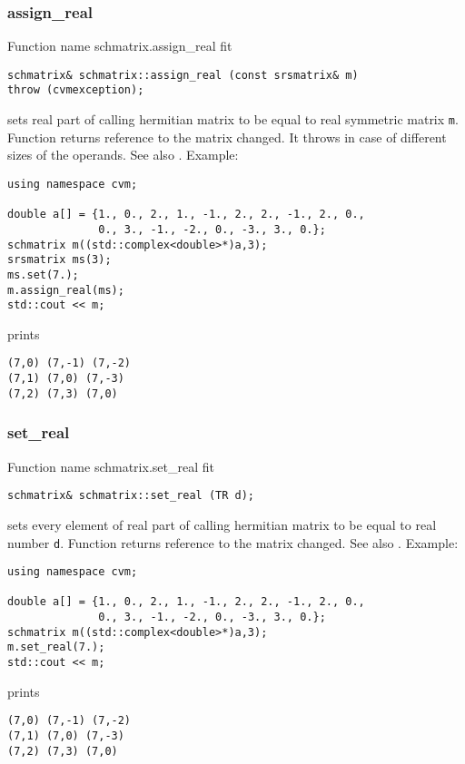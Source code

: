\subsubsection{assign\_real}
Function%
\pdfdest name {schmatrix.assign_real} fit
\begin{verbatim}
schmatrix& schmatrix::assign_real (const srsmatrix& m) 
throw (cvmexception);
\end{verbatim}
sets real part of  calling hermitian matrix to be equal to
real symmetric matrix \verb"m".
Function returns reference to
the matrix changed.
It throws  
in case of different sizes of the operands.
See also .
Example:
\begin{Verbatim}
using namespace cvm;

double a[] = {1., 0., 2., 1., -1., 2., 2., -1., 2., 0.,
              0., 3., -1., -2., 0., -3., 3., 0.};
schmatrix m((std::complex<double>*)a,3);
srsmatrix ms(3);
ms.set(7.);
m.assign_real(ms);
std::cout << m;
\end{Verbatim}
prints
\begin{Verbatim}
(7,0) (7,-1) (7,-2)
(7,1) (7,0) (7,-3)
(7,2) (7,3) (7,0)
\end{Verbatim}
\newpage



\subsubsection{set\_real}
Function%
\pdfdest name {schmatrix.set_real} fit
\begin{verbatim}
schmatrix& schmatrix::set_real (TR d);
\end{verbatim}
sets every element of  real part of  calling 
hermitian matrix to be equal to
 real number \verb"d".
Function returns  reference to
the matrix changed.
See also .
Example:
\begin{Verbatim}
using namespace cvm;

double a[] = {1., 0., 2., 1., -1., 2., 2., -1., 2., 0.,
              0., 3., -1., -2., 0., -3., 3., 0.};
schmatrix m((std::complex<double>*)a,3);
m.set_real(7.);
std::cout << m;
\end{Verbatim}
prints
\begin{Verbatim}
(7,0) (7,-1) (7,-2)
(7,1) (7,0) (7,-3)
(7,2) (7,3) (7,0)
\end{Verbatim}
\newpage



